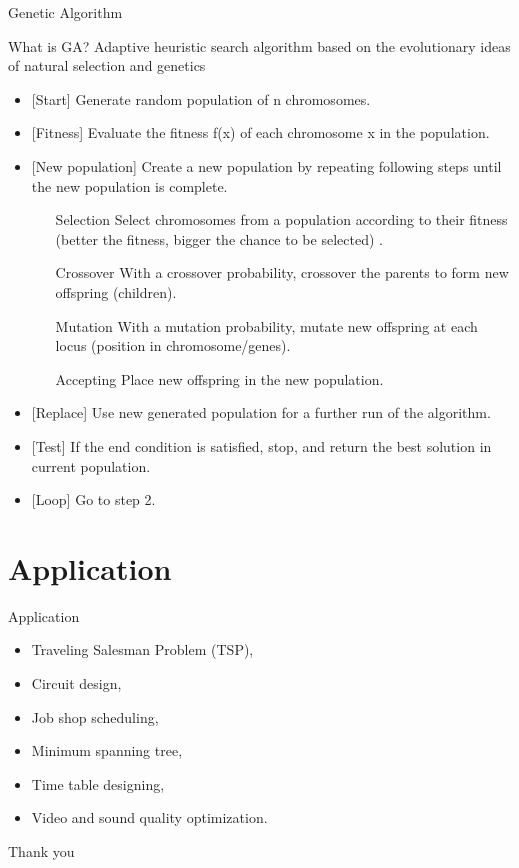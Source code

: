 \documentclass{beamer}
\begin{document}
\begin{frame}{Genetic Algorithm}
\begin{block}{What is GA?}
Adaptive heuristic search algorithm based on the evolutionary ideas of natural selection and genetics

\end{block}
\end{frame}
\begin{frame}
\begin{theorem}
\begin{itemize}
\item{
[Start] Generate random population of n chromosomes. 
}
\item{
[Fitness] Evaluate the fitness f(x) of each chromosome x in the population. 
}
\item{
[New population] Create 	a new population by repeating following  steps until the new population is complete. 
\begin{itemize}
\item [Selection] Select chromosomes from a population according to their fitness (better the fitness, bigger the chance to be selected) .
\item [Crossover] With a crossover probability, crossover the parents to form new offspring (children). 
\item [Mutation] With a mutation probability, mutate new offspring at each locus (position in chromosome/genes). 
\item [Accepting] Place new offspring in the new population.

\end{itemize}
}

\item{
[Replace] Use new generated population for a further run of the algorithm.
}
\item{
[Test] If the end condition is satisfied, stop, and return the best solution in current population.
}
\item{
[Loop] Go to step 2. 
}
\end{itemize}

\end{theorem}
\end{frame}


\section*{Application}

\begin{frame}{Application}
  \begin{itemize}
  \item
  Traveling Salesman Problem (TSP), 
  \item
Circuit design,
  \item
Job shop scheduling,
  \item
Minimum spanning tree,
  \item
Time table designing,
  \item
Video and sound quality optimization. 

 
  \end{itemize}
  
 
 
\end{frame}

\begin{frame}
Thank you
\end{frame}
\end{document}
